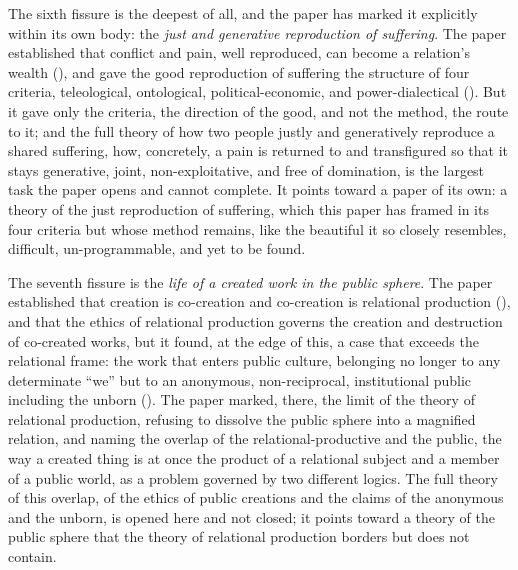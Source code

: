 The sixth fissure is the deepest of all, and the paper has marked it explicitly within its own body: the \emph{just and generative reproduction of suffering}. The paper established that conflict and pain, well reproduced, can become a relation's wealth (), and gave the good reproduction of suffering the structure of four criteria, teleological, ontological, political-economic, and power-dialectical (). But it gave only the criteria, the direction of the good, and not the method, the route to it; and the full theory of how two people justly and generatively reproduce a shared suffering, how, concretely, a pain is returned to and transfigured so that it stays generative, joint, non-exploitative, and free of domination, is the largest task the paper opens and cannot complete. It points toward a paper of its own: a theory of the just reproduction of suffering, which this paper has framed in its four criteria but whose method remains, like the beautiful it so closely resembles, difficult, un-programmable, and yet to be found.

The seventh fissure is the \emph{life of a created work in the public sphere}. The paper established that creation is co-creation and co-creation is relational production (), and that the ethics of relational production governs the creation and destruction of co-created works, but it found, at the edge of this, a case that exceeds the relational frame: the work that enters public culture, belonging no longer to any determinate ``we'' but to an anonymous, non-reciprocal, institutional public including the unborn (). The paper marked, there, the limit of the theory of relational production, refusing to dissolve the public sphere into a magnified relation, and naming the overlap of the relational-productive and the public, the way a created thing is at once the product of a relational subject and a member of a public world, as a problem governed by two different logics. The full theory of this overlap, of the ethics of public creations and the claims of the anonymous and the unborn, is opened here and not closed; it points toward a theory of the public sphere that the theory of relational production borders but does not contain.

